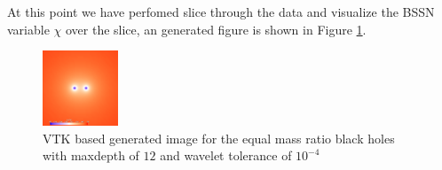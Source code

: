 At this point we have perfomed slice through the data and visualize the BSSN variable $\chi$ over the slice, an generated figure is shown in Figure \ref{fig:vtk:r1}. 

\begin{figure}[H]
    \centering
    \includegraphics[width=0.2\textwidth]{figs/vtk/r1/img_slice_000000.png}
    \caption{VTK based generated image for the equal mass ratio black holes with maxdepth of $12$ and wavelet tolerance of $10^{-4}$ \label{fig:vtk:r1}}
\end{figure}

